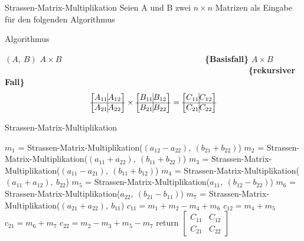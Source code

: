\documentclass{beamer}
\begin{document}
	\begin{frame}{Strassen-Matrix-Multiplikation}
		Seien A und B zwei $n \times n$ Matrizen als Eingabe für den folgenden Algorithmus
		\begin{algorithm}[H]
			{Algorithmus}
			\caption[Strassen-Matrix-Multiplikation]{Strassen-Matrix-Multiplikation}
			\begin{algorithmic}[1]
				\Require $(A, \ B)$
				\Ensure $A \times B$
				  \ \ \ \ \ \ \ \ \ \ \ \ \ \ \ \ \ \ \ \ \ \ \ \ \ \ \ \ \ \ \ \ \ \ \textbf{\{Basisfall\}}
				\State $A \times B$
				\Else  \ \ \ \ \ \ \ \ \ \ \ \ \ \ \ \ \ \ \ \ \ \ \ \ \ \ \ \ \ \ \ \ \ \ \ \ \ \ \ \ \ \ \ \ \ \ \ \ \ \ \ \ \ \ \ \ \ \ \ \textbf{\{rekursiver Fall\}}
				\State $$
				\begin{bmatrix}
					A_{11} \vline A_{12}\\ \hline
					A_{21} \vline A_{22} 
				\end{bmatrix}
				\times
				\begin{bmatrix}
					B_{11} \vline B_{12}\\ \hline
					B_{21} \vline B_{22}
				\end{bmatrix}
				=
				\begin{bmatrix}
					C_{11} \vline C_{12}\\ \hline
					C_{21} \vline C_{22}
				\end{bmatrix}
				$$
				
			\end{algorithmic}
		\end{algorithm} 
	\end{frame}

	\begin{frame}{Strassen-Matrix-Multiplikation}
		\begin{algorithm}[H]
			\caption[Strassen-Matrix-Multiplikation]{Strassen-Matrix-Multiplikation}
			\begin{algorithmic}[1]
				\State $m_1$ = Strassen-Matrix-Multiplikation($(a_{12} - a_{22}) ,\ (b_{21} + b_{22})$)
				\State $m_2$ = Strassen-Matrix-Multiplikation($(a_{11} + a_{22}) ,\ (b_{11} + b_{22})$)
				\State $m_3$ = Strassen-Matrix-Multiplikation($(a_{11} - a_{21}) ,\ (b_{11} + b_{12})$)
				\State $m_4$ = Strassen-Matrix-Multiplikation($(a_{11} + a_{12}) ,\ b_{22}$)
				\State $m_5$ = Strassen-Matrix-Multiplikation($a_{11} ,\ (b_{12} - b_{22})$)
				\State $m_6$ = Strassen-Matrix-Multiplikation($a_{22} ,\ (b_{21} - b_{11})$)
				\State $m_7$ = Strassen-Matrix-Multiplikation($(a_{21} + a_{22}) ,\ b_{11}$)
				\State $c_{11} = m_{1} + m_{2} - m_{4} + m_{6}$
				\State $c_{12} = m_{4} + m_{5}$
				\State $c_{21} = m_{6} + m_{7}$
				\State $c_{22} = m_{2} - m_{3} + m_{5} - m_{7}$
				\State return 
				$\begin{bmatrix}
					C_{11} & C_{12}\\
					C_{21} & C_{22}
				\end{bmatrix}$
				\EndIf
			\end{algorithmic}
		\end{algorithm} 
	\end{frame}
		
\end{document}

